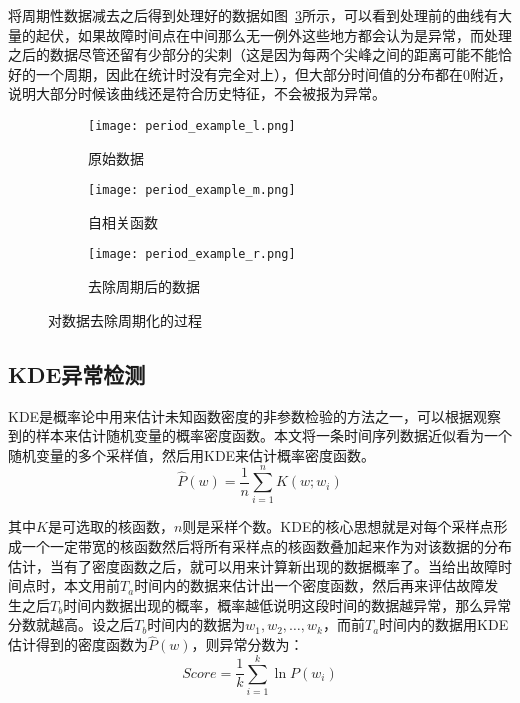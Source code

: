 将周期性数据减去之后得到处理好的数据如图~\ref{fig:period:right}所示，可以看到处理前的曲线有大量的起伏，如果故障时间点在中间那么无一例外这些地方都会认为是异常，而处理之后的数据尽管还留有少部分的尖刺（这是因为每两个尖峰之间的距离可能不能恰好的一个周期，因此在统计时没有完全对上），但大部分时间值的分布都在0附近，说明大部分时候该曲线还是符合历史特征，不会被报为异常。
\begin{figure}[htbp]
  \begin{subfigure}[b]{0.335\textwidth}
    \begin{minipage}[t]{\linewidth}
    \centering
    \texttt{[image: period\_example\_l.png]}
    \caption{原始数据}
    \label{fig:period:left}
    \end{minipage}
  \end{subfigure}
  \begin{subfigure}[b]{0.325\textwidth}
    \begin{minipage}[t]{\linewidth}
    \centering
    \texttt{[image: period\_example\_m.png]}
    \caption{自相关函数}
    \label{fig:period:middle}
    \end{minipage}
  \end{subfigure}
  \begin{subfigure}[b]{0.325\textwidth}
    \begin{minipage}[t]{\linewidth}
      \centering
      \texttt{[image: period\_example\_r.png]}
      \caption{去除周期后的数据}
      \label{fig:period:right}
      \end{minipage}
    \end{subfigure}
    \caption{对数据去除周期化的过程}
    \label{fig:period}
\end{figure}
\subsection{KDE异常检测}
KDE是概率论中用来估计未知函数密度的非参数检验的方法之一，可以根据观察到的样本来估计随机变量的概率密度函数。本文将一条时间序列数据近似看为一个随机变量的多个采样值，然后用KDE来估计概率密度函数。
\begin{equation*}
\hat{P}(w) = \frac{1}{n}\sum_{i=1}^nK(w;w_i)
\end{equation*}

其中$K$是可选取的核函数，$n$则是采样个数。KDE的核心思想就是对每个采样点形成一个一定带宽的核函数然后将所有采样点的核函数叠加起来作为对该数据的分布估计，当有了密度函数之后，就可以用来计算新出现的数据概率了。当给出故障时间点时，本文用前$T_a$时间内的数据来估计出一个密度函数，然后再来评估故障发生之后$T_b$时间内数据出现的概率，概率越低说明这段时间的数据越异常，那么异常分数就越高。设之后$T_b$时间内的数据为$w_1,w_2,\dots,w_k$，而前$T_a$时间内的数据用KDE估计得到的密度函数为$\hat{P}(w)$，则异常分数为：
\begin{equation*}
  Score = \frac{1}{k}\sum_{i=1}^k\ln P(w_i)
\end{equation*}

